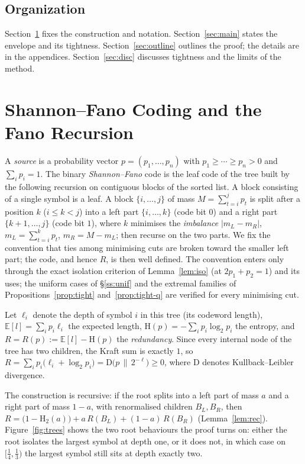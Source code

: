 \documentclass[journal]{IEEEtran}
\theoremstyle{definition}
\newcommand{\Hh}{\mathrm H_2}
\newcommand{\lgg}{\log_2}
\begin{document}
\subsection*{Organization}
Section~\ref{sec:model} fixes the construction and notation.
Section~\ref{sec:main} states the envelope and its tightness.
Section~\ref{sec:outline} outlines the proof; the details are in the appendices.
Section~\ref{sec:disc} discusses tightness and the limits of the method.

\section{Shannon--Fano Coding and the Fano Recursion}\label{sec:model}

A \emph{source} is a probability vector $p=(p_1,\dots,p_n)$ with
$p_1\ge\cdots\ge p_n>0$ and $\sum_i p_i=1$. The binary \emph{Shannon--Fano} code
\cite{Shannon48,Fano49} is the leaf code of the tree built by the following
recursion on contiguous blocks of the sorted list. A block consisting of a single
symbol is a leaf. A block $\{i,\dots,j\}$ of mass $M=\sum_{t=i}^{j}p_t$ is split
after a position $k$ ($i\le k<j$) into a left part $\{i,\dots,k\}$ (code bit $0$)
and a right part $\{k+1,\dots,j\}$ (code bit $1$), where $k$ minimises the
\emph{imbalance} $|m_L-m_R|$, $m_L=\sum_{t=i}^{k}p_t$, $m_R=M-m_L$; then recurse
on the two parts. We fix the convention that ties among minimising cuts are
broken toward the smaller left part; the code, and hence $R$, is then well
defined. The convention enters only through the exact isolation criterion of
Lemma~\ref{lem:iso} \textup{(}at $2p_1+p_2=1$\textup{)} and its uses; the
uniform cases of \S\ref{ss:unif} and the extremal families of
Propositions~\ref{prop:tight} and~\ref{prop:tight-q} are verified for every
minimising cut.

Let $\ell_i$ denote the depth of symbol $i$ in this tree (its codeword length),
$\mathbb E[l]=\sum_i p_i\ell_i$ the expected length, $\mathrm H(p)=-\sum_i p_i\lgg p_i$ the entropy, and $R = R(p) := \mathbb E[l]-\mathrm H(p)$
the \emph{redundancy}. Since every internal node of the tree has two children,
the Kraft sum is exactly $1$, so $R=\sum_i p_i\bigl(\ell_i+\lgg p_i\bigr)
=\mathrm D\bigl(p\,\|\,2^{-\ell}\bigr)\ge0$, where $\mathrm D$ denotes
Kullback--Leibler divergence.

The construction is recursive: if the root splits into a left part of mass $a$
and a right part of mass $1-a$, with renormalised children $B_L,B_R$, then
$R=\bigl(1-\Hh(a)\bigr)+a\,R(B_L)+(1-a)\,R(B_R)$ (Lemma~\ref{lem:rec}).
Figure~\ref{fig:trees} shows the two root behaviours the proof turns on: either
the root isolates the largest symbol at depth one, or it does not, in which case
on $[\tfrac14,\tfrac13)$ the largest symbol still sits at depth exactly two.
\end{document}
